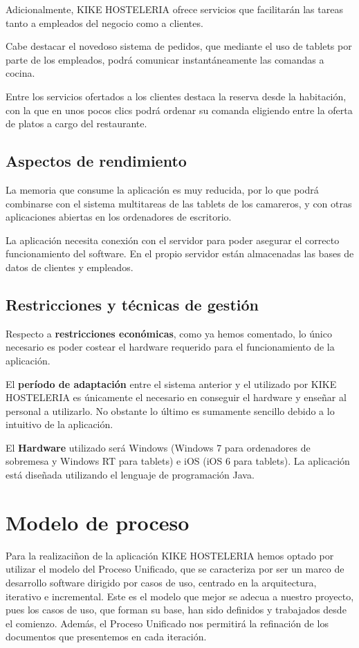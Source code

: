 \documentclass[spanish,a4paper,12pt]{report}	%
\begin{document}
Adicionalmente, KIKE HOSTELERIA ofrece servicios que facilitarán las tareas tanto a empleados del negocio como a clientes. 

Cabe destacar el novedoso sistema de pedidos, que mediante el uso de tablets por parte de los empleados, podrá comunicar instantáneamente las comandas a cocina. 

Entre los servicios ofertados a los clientes destaca la reserva desde la habitación, con la que en unos pocos clics podrá ordenar su comanda eligiendo entre la oferta de platos a cargo del restaurante.



		\subsection{Aspectos de rendimiento}  La memoria que consume la aplicación es muy reducida, por lo que podrá combinarse con el sistema multitareas de las tablets de los camareros, y con otras aplicaciones abiertas en los ordenadores de escritorio.

La aplicación necesita conexión con el servidor para poder asegurar el correcto funcionamiento del software. En el propio servidor están almacenadas las bases de datos de clientes y empleados.


		\subsection{Restricciones y técnicas de gestión}
Respecto a \textbf{restricciones económicas}, como ya hemos comentado, lo único necesario es poder costear el hardware requerido para el funcionamiento de la aplicación.

El \textbf{período de adaptación} entre el sistema anterior y el utilizado por KIKE HOSTELERIA es únicamente el necesario en conseguir el hardware y enseñar al personal a utilizarlo. No obstante lo último es sumamente sencillo debido a lo intuitivo de la aplicación.

El \textbf{Hardware} utilizado será Windows (Windows 7 para ordenadores de sobremesa y Windows RT para tablets) e iOS (iOS 6 para tablets). La aplicación está diseñada utilizando el lenguaje de programación Java.

	\section{Modelo de proceso} Para la realizaciñon de la aplicación KIKE HOSTELERIA hemos optado por utilizar el modelo del Proceso Unificado, que se caracteriza por ser un marco de desarrollo software dirigido por casos de uso, centrado en la arquitectura, iterativo e incremental. Este es el modelo que mejor se adecua a nuestro proyecto, pues los casos de uso, que forman su base, han sido definidos y trabajados desde el comienzo. Además, el Proceso Unificado nos permitirá la refinación de los documentos que presentemos en cada iteración.
\end{document}

